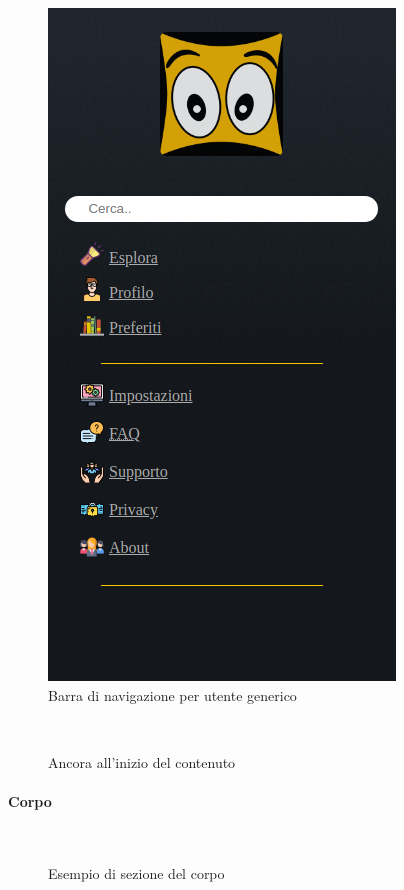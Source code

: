\begin{figure}[h!]  				%
	\centerline{\includegraphics[scale=0.45]{img/nav_bar.png}}
	\caption{Barra di navigazione per utente generico}
\end{figure}
~\\

\begin{figure}[h!]
	\caption{Ancora all'inizio del contenuto}
\end{figure}
\paragraph{Corpo}
~\\

\begin{figure}[h!]
	\caption{Esempio di sezione del corpo}
	\label{fig:corpoGU}
\end{figure}
